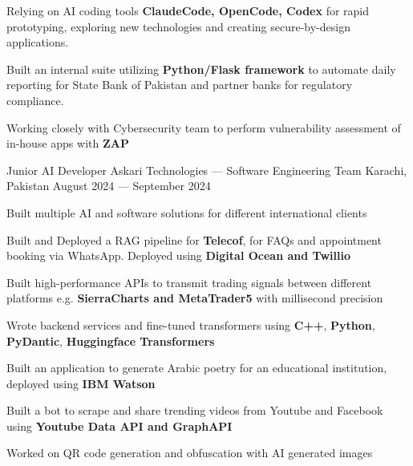 \begin{cventries}
{\begin{cvitems}
\begin{itemize}
      \end{itemize}
    \item {Relying on AI coding tools \textbf{ClaudeCode, OpenCode, Codex} for rapid prototyping, exploring new technologies and creating secure-by-design applications.}
    \item {Built an internal suite utilizing \textbf{Python/Flask framework} to automate daily reporting for State Bank of Pakistan and partner banks for regulatory compliance.}
    \item {Working closely with Cybersecurity team to perform vulnerability assessment of in-house apps with \textbf{ZAP}}
    \end{cvitems}
}

\vspace{\myspacing}


\cventry
{Junior AI Developer} %
{Askari Technologies --- Software Engineering Team} %
{Karachi, Pakistan} %
{August 2024 --- September 2024} %
{%
  \begin{cvitems}
    \item {Built multiple AI and software solutions for different international clients}
    \item {Built and Deployed a RAG pipeline for \textbf{Telecof}, for FAQs and appointment booking via WhatsApp. Deployed using \textbf{Digital Ocean and Twillio}}
    \item {Built high-performance APIs to transmit trading signals between different platforms e.g. \textbf{SierraCharts and MetaTrader5} with millisecond precision}
    \item {Wrote backend services and fine-tuned transformers using \textbf{C++}, \textbf{Python}, \textbf{PyDantic}, \textbf{Huggingface Transformers}}
    \item {Built an application to generate Arabic poetry for an educational institution, deployed using \textbf{IBM Watson}}
    \item {Built a bot to scrape and share trending videos from Youtube and Facebook using \textbf{Youtube Data API and GraphAPI}}
    \item {Worked on QR code generation and obfuscation with AI generated images}
  \end{cvitems}
}
\vspace{\myspacing}



\end{cventries}
